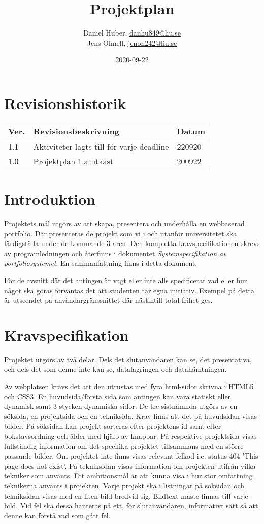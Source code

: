 \documentclass{TDP003mall}
\author{Daniel Huber, \url{danhu849@liu.se}\\
  Jens Öhnell, \url{jenoh242@liu.se}}
\title{Projektplan}
\date{2020-09-22}
\begin{document}
\projectpage
\section{Revisionshistorik}
\begin{table}[!h]
\begin{tabularx}{\linewidth}{|l|X|l|}
\hline
Ver. & Revisionsbeskrivning & Datum \\\hline
1.1 & Aktiviteter lagts till för varje deadline & 220920\\\hline
1.0 & Projektplan 1:a utkast & 200922 \\\hline
\end{tabularx}
\end{table}


\section{Introduktion}
Projektets mål utgörs av att skapa, presentera och underhålla en webbaserad portfolio. Där presenteras de projekt som vi i och utanför universitetet ska färdigställa under de kommande 3 åren. Den kompletta kravspecifikationen skrevs av programledningen och återfinns i dokumentet \textit{Systemspecifikation av portfoliosystemet}. En sammanfattning finns i detta dokument.

För de avsnitt där det antingen är vagt eller inte alls specificerat vad eller hur något ska göras förväntas det att studenten tar egna initiativ. Exempel på detta är utseendet på användargränssnittet där nästintill total frihet ges.


\section{Kravspecifikation}
Projektet utgörs av två delar. Dels det slutanvändaren kan se, det presentativa, och dels det som denne inte kan se, datalagringen och datahämtningen.

Av webplatsen krävs det att den utrustas med fyra html-sidor skrivna i HTML5 och CSS3. En huvudsida/första sida som antingen kan vara statiskt eller dynamisk samt 3 stycken dynamiska sidor. De tre sistnämnda utgörs av en söksida, en projektsida och en tekniksida. Krav finns att det på huvudsidan visas bilder. På söksidan kan projekt sorteras efter projektens id samt efter bokstavsordning och ålder med hjälp av knappar. På respektive projektsida visas fullständig information om det specifika projektet tillsammans med en större passande bilder. Om projektet inte finns visas relevant felkod i.e. status 404 'This page does not exist'. På tekniksidan visas information om projekten utifrån vilka tekniker som använts. Ett ambitionsmål är att kunna visa i hur stor omfattning teknikerna använts i projekten. Varje projekt ska i listningar på söksidan och tekniksidan visas med en liten bild bredvid sig. Bildtext måste finnas till varje bild. Vid fel ska dessa hanteras på ett, för slutanvändaren, informativt sätt så att denne kan förstå vad som gått fel.
\end{document}
